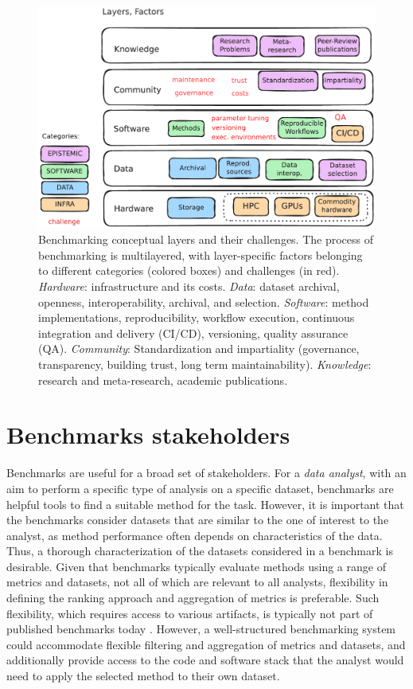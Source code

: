 \documentclass[11pt]{article}
\begin{document}
\begin{figure}
    \centering
    \includegraphics[width=0.8\linewidth]{figures/bens_layers.pdf}
    \caption[Benchmarking conceptual layers and their challenges.]{Benchmarking conceptual layers and their challenges. The process of benchmarking is multilayered, with layer-specific factors belonging to different categories (colored boxes) and challenges (in red). \emph{Hardware}: infrastructure and its costs. \emph{Data}: dataset archival, openness, interoperability, archival, and selection.  \emph{Software}: method implementations, reproducibility, workflow execution, continuous integration and delivery (CI/CD), versioning, quality assurance (QA). \emph{Community}: Standardization and impartiality (governance, transparency, building trust, long term maintainability). \emph{Knowledge}: research and meta-research, academic publications.}
    \label{fig:layers}
\end{figure}

\section*{Benchmarks stakeholders}

Benchmarks are useful for a broad set of stakeholders. For a \emph{data analyst}, with an aim to perform a specific type of analysis on a specific dataset, benchmarks are helpful tools to find a suitable method for the task. However, it is important that the benchmarks consider datasets that are similar to the one of interest to the analyst, as method performance often depends on characteristics of the data. Thus, a thorough characterization of the datasets considered in a benchmark is desirable. Given that benchmarks typically evaluate methods using a range of metrics and datasets, not all of which are relevant to all analysts, flexibility in defining the ranking approach and aggregation of metrics is preferable. Such flexibility, which requires access to various artifacts, is typically not part of published benchmarks today \cite{Sonrel2023-te}. However, a well-structured benchmarking system could accommodate flexible filtering and aggregation of metrics and datasets, and additionally provide access to the code and software stack that the analyst would need to apply the selected method to their own dataset. 
\end{document}
